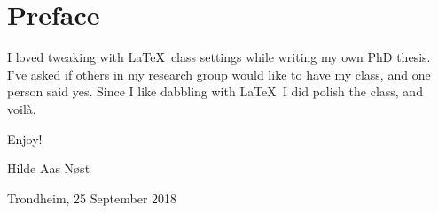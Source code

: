 \chapter{Preface}

I loved tweaking with \LaTeX\ class settings while writing my own PhD thesis.
I've asked if others in my research group would like to have my class, and one person said yes.
Since I like dabbling with \LaTeX\, I did polish the class, and voilà.

Enjoy!

\vfil

\hfill Hilde Aas Nøst

\hfill Trondheim, 25 September 2018
